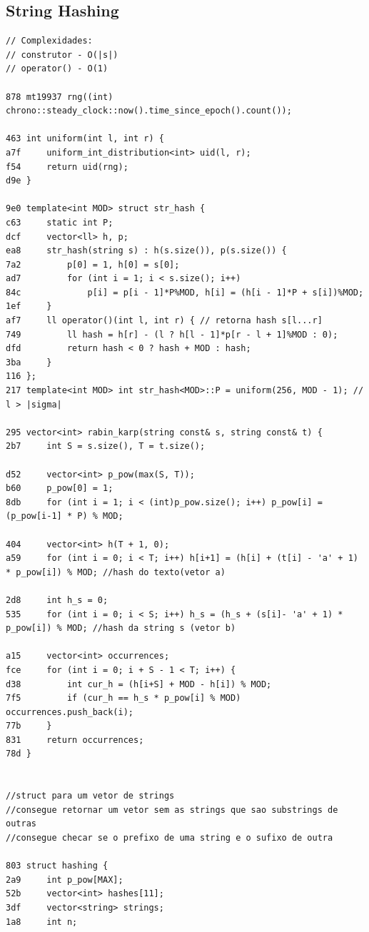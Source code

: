\documentclass[11pt, a4paper, twoside]{article}
\begin{document}
\subsection{String Hashing}
\begin{lstlisting}
// Complexidades:
// construtor - O(|s|)
// operator() - O(1)

878 mt19937 rng((int) chrono::steady_clock::now().time_since_epoch().count());
 
463 int uniform(int l, int r) {
a7f 	uniform_int_distribution<int> uid(l, r);
f54 	return uid(rng);
d9e }
 
9e0 template<int MOD> struct str_hash {
c63 	static int P;
dcf 	vector<ll> h, p;
ea8 	str_hash(string s) : h(s.size()), p(s.size()) {
7a2 		p[0] = 1, h[0] = s[0];
ad7 		for (int i = 1; i < s.size(); i++)
84c 			p[i] = p[i - 1]*P%MOD, h[i] = (h[i - 1]*P + s[i])%MOD;
1ef 	}
af7 	ll operator()(int l, int r) { // retorna hash s[l...r]
749 		ll hash = h[r] - (l ? h[l - 1]*p[r - l + 1]%MOD : 0);
dfd 		return hash < 0 ? hash + MOD : hash;
3ba 	}
116 };
217 template<int MOD> int str_hash<MOD>::P = uniform(256, MOD - 1); // l > |sigma|

295 vector<int> rabin_karp(string const& s, string const& t) {
2b7     int S = s.size(), T = t.size();
            
d52     vector<int> p_pow(max(S, T)); 
b60     p_pow[0] = 1; 
8db     for (int i = 1; i < (int)p_pow.size(); i++) p_pow[i] = (p_pow[i-1] * P) % MOD;
        
404     vector<int> h(T + 1, 0); 
a59     for (int i = 0; i < T; i++) h[i+1] = (h[i] + (t[i] - 'a' + 1) * p_pow[i]) % MOD; //hash do texto(vetor a)
        
2d8     int h_s = 0; 
535     for (int i = 0; i < S; i++) h_s = (h_s + (s[i]- 'a' + 1) * p_pow[i]) % MOD; //hash da string s (vetor b)
        
a15     vector<int> occurrences;
fce     for (int i = 0; i + S - 1 < T; i++) {
d38         int cur_h = (h[i+S] + MOD - h[i]) % MOD;
7f5         if (cur_h == h_s * p_pow[i] % MOD) occurrences.push_back(i);
77b     }
831     return occurrences;
78d }


//struct para um vetor de strings
//consegue retornar um vetor sem as strings que sao substrings de outras
//consegue checar se o prefixo de uma string e o sufixo de outra

803 struct hashing {
2a9     int p_pow[MAX]; 
52b     vector<int> hashes[11];
3df     vector<string> strings;
1a8     int n;
        

\end{lstlisting}
\end{document}
